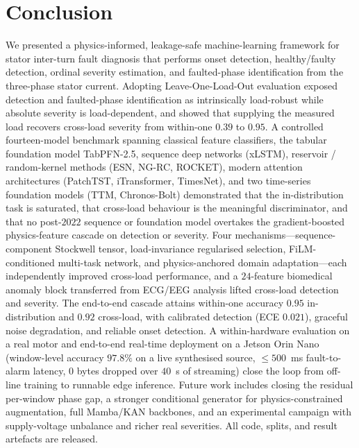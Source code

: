 \documentclass[journal]{IEEEtran}
\begin{document}
\section{Conclusion}
We presented a physics-informed, leakage-safe machine-learning framework for stator
inter-turn fault diagnosis that performs onset detection, healthy/faulty detection,
ordinal severity estimation, and faulted-phase identification from the three-phase stator
current. Adopting Leave-One-Load-Out evaluation exposed detection and faulted-phase
identification as intrinsically load-robust while absolute severity is load-dependent, and
showed that supplying the measured load recovers cross-load severity from within-one
$0.39$ to $0.95$. A controlled fourteen-model benchmark spanning classical feature
classifiers, the tabular foundation model TabPFN-2.5, sequence deep networks (xLSTM),
reservoir / random-kernel methods (ESN, NG-RC, ROCKET), modern attention architectures
(PatchTST, iTransformer, TimesNet), and two time-series foundation models (TTM,
Chronos-Bolt) demonstrated that the in-distribution task is saturated, that cross-load
behaviour is the meaningful discriminator, and that no post-$2022$ sequence or foundation
model overtakes the gradient-boosted physics-feature cascade on detection or severity. Four mechanisms---sequence-component Stockwell tensor, load-invariance
regularised selection, FiLM-conditioned multi-task network, and physics-anchored domain
adaptation---each independently improved cross-load performance, and a $24$-feature
biomedical anomaly block transferred from ECG/EEG analysis lifted cross-load detection
and severity. The end-to-end cascade attains within-one accuracy $0.95$ in-distribution
and $0.92$ cross-load, with calibrated detection (ECE $0.021$), graceful noise degradation,
and reliable onset detection. A within-hardware evaluation on a real motor and end-to-end
real-time deployment on a Jetson Orin Nano (window-level accuracy $97.8\%$ on a live
synthesised source, $\leq\!500$~ms fault-to-alarm latency, $0$ bytes dropped over
$40$~s of streaming) close the loop from off-line training to runnable edge inference.
Future work includes closing the residual per-window phase gap, a stronger conditional
generator for physics-constrained augmentation, full Mamba/KAN backbones, and an
experimental campaign with supply-voltage unbalance and richer real severities. All code,
splits, and result artefacts are released.
\end{document}
